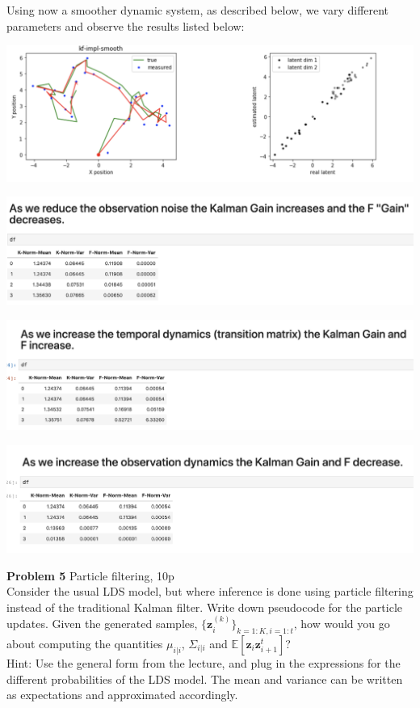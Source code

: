 \documentclass[12pt]{article}
\begin{document}
Using now a smoother dynamic system, as described below, we vary different parameters and observe the results listed below:
\begin{center}
	\includegraphics[width=1\linewidth]{figures/problem_4_4.png} 
\end{center}
\begin{center}
	\includegraphics[width=1\linewidth]{figures/problem_4_5.png} 
\end{center}
\begin{center}
	\includegraphics[width=1\linewidth]{figures/problem_4_6.png} 
\end{center}
\begin{center}
	\includegraphics[width=1\linewidth]{figures/problem_4_7.png} 
\end{center}

\noindent \textbf{Problem 5 }  Particle filtering, 10p\\%
Consider the usual LDS model, but where inference is done using particle filtering instead of the traditional Kalman filter. Write down pseudocode for the particle updates. Given the generated samples, $\{\mathbf{z}_i^{(k)}\}_{k=1:K, i=1:t}$, how would you go about computing the quantities $\mu_{i|i}$, $\Sigma_{i|i}$ and $\mathbb{E}[\mathbf{z}_i \mathbf{z}_{i+1}^t]$?\\
Hint: Use the general form from the lecture, and plug in the expressions for the different probabilities of the LDS model. The mean and variance can be written as expectations and approximated accordingly.
\end{document}
